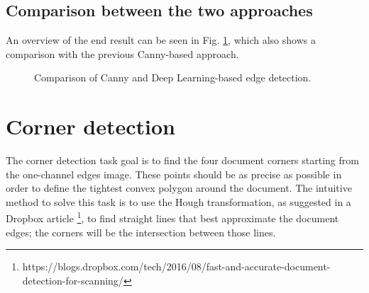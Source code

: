 \documentclass[a4paper]{article}
\begin{document}
\subsection{Comparison between the two approaches}

An overview of the end result can be seen in Fig. \ref{fig:deep_comparison}, which also shows a comparison with the previous Canny-based approach.

\begin{figure}[!htbp]
	\centering

	\caption{Comparison of Canny and Deep Learning-based edge detection.}
	\label{fig:deep_comparison}
\end{figure}

\section{Corner detection}

The corner detection task goal is to find the four document corners starting from the one-channel edges image. These points should be as precise as possible in order to define the tightest convex polygon around the document. The intuitive method to solve this task is to use the Hough transformation, as suggested in a Dropbox article \footnote{https://blogs.dropbox.com/tech/2016/08/fast-and-accurate-document-detection-for-scanning/}, to find straight lines that best approximate the document edges; the corners will be the intersection between those lines.
\end{document}

